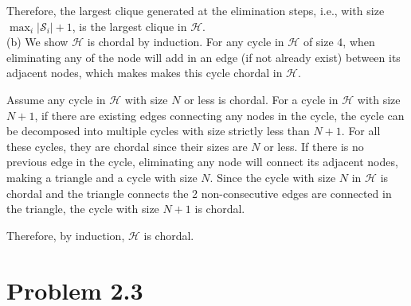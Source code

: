 \documentclass{article}
\newcommand{\qeds}{\hfill\qedsymbol}
\begin{document}
Therefore, the largest clique generated at the elimination steps, i.e., with size $\max_i |\mathscr{S}_i| +1$, is the largest clique in $\mathscr{H}$. \qeds
\\

%
\noindent
(b) We show $\mathscr{H}$ is chordal by induction.
%
For any cycle in $\mathscr{H}$ of size $4$, when eliminating any of the node will add in an edge (if not already exist) between its adjacent nodes, which makes makes this cycle chordal in $\mathscr{H}$.

%
Assume any cycle in $\mathscr{H}$ with size $N$ or less is chordal. For a cycle in $\mathscr{H}$ with size $N+1$, if there are existing edges connecting any nodes in the cycle, the cycle can be decomposed into multiple cycles with size strictly less than $N+1$. For all these cycles, they are chordal since their sizes are $N$ or less. If there is no previous edge in the cycle, eliminating any node will connect its adjacent nodes, making a triangle and a cycle with size $N$. Since the cycle with size $N$ in $\mathscr{H}$ is chordal and the triangle connects the 2 non-consecutive edges are connected in the triangle, the cycle with size $N+1$ is chordal. 

%
Therefore, by induction, $\mathscr{H}$ is chordal. \qeds

\pagebreak

\section*{Problem 2.3}
\end{document}
